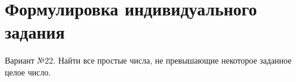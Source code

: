 \section{Формулировка индивидуального задания}

Вариант №22. Найти все простые числа, не превышающие некоторое заданное целое число.
